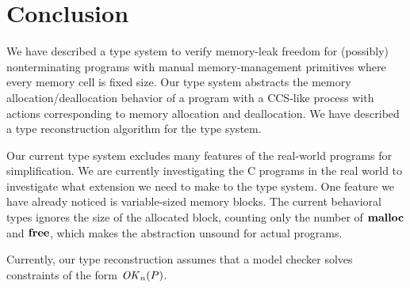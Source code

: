 \section{Conclusion}\label{sec:conclusion}

We have described a type system to verify memory-leak freedom for
(possibly) nonterminating programs with manual memory-management
primitives where every memory cell is fixed size.  Our type system
abstracts the memory allocation/deallocation behavior of a program
with a CCS-like process with actions corresponding to memory
allocation and deallocation.  We have described a type reconstruction
algorithm for the type system.

Our current type system excludes many features of the real-world
programs for simplification.  We are currently investigating the C
programs in the real world to investigate what extension we need to
make to the type system.  One feature we have already noticed is
variable-sized memory blocks.  The current behavioral types ignores
the size of the allocated block, counting only the number of
\(\mathbf{malloc}\) and \(\mathbf{free}\), which makes the abstraction unsound for
actual programs.

Currently, our type reconstruction assumes that a model checker solves
constraints of the form \(\mathit{OK}_n(P)\).  

